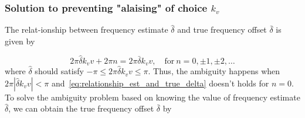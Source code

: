 \subsubsection{Solution to preventing "alaising" of choice $k_v$}

The relat-ionship between frequency estimate $\hat{\delta}$ and true frequency offset $\bar{\delta}$ is given by 

\begin{equation}
  \label{eq:relationship_est_and_true_delta}
  2\pi \hat{\delta}k_vv+2\pi n=2\pi \bar{\delta}k_vv, \quad \text{for}~n=0,\pm 1,\pm 2,\ldots
\end{equation}
where $\hat{\delta}$ should satisfy $-\pi \leq 2\pi \hat{\delta}k_vv \leq \pi$. Thus, the ambiguity happens when $2\pi|\hat{\delta}k_vv|<\pi$ and~\eqref{eq:relationship_est_and_true_delta} doesn't holds for $n=0$.
To solve the ambiguity problem based on knowing the value of frequency estimate $\hat{\delta}$, we can obtain the true frequency offset $\bar{\delta}$ by 






